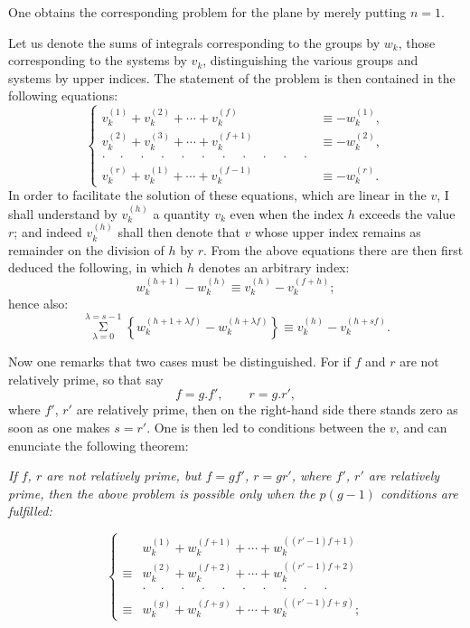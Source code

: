 \documentclass{article}
\begin{document}
One obtains the corresponding problem for the plane by merely putting $n=1$.

Let us denote the sums of integrals corresponding to the groups by $w_{k}$, those corresponding to the systems by $v_{k}$, distinguishing the various groups and systems by upper indices. The statement of the problem is then contained in the following equations:
\[ \left\{ \begin{aligned}
v_{k}^{(1)}+v_{k}^{(2)}+\cdots+v_{k}^{(f)} &\equiv -w_{k}^{(1)}, \\
v_{k}^{(2)}+v_{k}^{(3)}+\cdots+v_{k}^{(f+1)} &\equiv -w_{k}^{(2)}, \\
\cdot\quad\cdot\quad\cdot\quad\cdot\quad\cdot\quad\cdot\quad\cdot\quad\cdot\quad\cdot\quad\cdot\quad\cdot & \\
v_{k}^{(r)}+v_{k}^{(1)}+\cdots+v_{k}^{(f-1)} &\equiv -w_{k}^{(r)}.
\end{aligned} \right. \tag{1.} \]
In order to facilitate the solution of these equations, which are linear in the $v$, I shall understand by $v_{k}^{(h)}$ a quantity $v_{k}$ even when the index $h$ exceeds the value $r$; and indeed $v_{k}^{(h)}$ shall then denote that $v$ whose upper index remains as remainder on the division of $h$ by $r$. From the above equations there are then first deduced the following, in which $h$ denotes an arbitrary index:
\[ w_{k}^{(h+1)}-w_{k}^{(h)} \equiv v_{k}^{(h)}-v_{k}^{(f+h)}; \]
hence also:
\[ \mathop{\Sigma}\limits_{\lambda=0}^{\lambda=s-1} \left\{ w_{k}^{(h+1+\lambda f)}-w_{k}^{(h+\lambda f)} \right\} \equiv v_{k}^{(h)}-v_{k}^{(h+sf)}. \tag{2.} \]

Now one remarks that two cases must be distinguished. For if $f$ and $r$ are not relatively prime, so that say
\[ f=g.f', \qquad r=g.r', \]
where $f'$, $r'$ are relatively prime, then on the right-hand side there stands zero as soon as one makes $s=r'$. One is then led to conditions between the $v$, and can enunciate the following theorem:

\emph{If $f$, $r$ are not relatively prime, but $f=gf'$, $r=gr'$, where $f'$, $r'$ are relatively prime, then the above problem is possible only when the $p(g-1)$ conditions are fulfilled:}

\[ \left\{ \begin{aligned}
& w_{k}^{(1)}+w_{k}^{(f+1)}+\cdots+w_{k}^{((r'-1)f+1)} \\
\equiv{} & w_{k}^{(2)}+w_{k}^{(f+2)}+\cdots+w_{k}^{((r'-1)f+2)} \\
& \cdot\quad\cdot\quad\cdot\quad\cdot\quad\cdot\quad\cdot\quad\cdot\quad\cdot\quad\cdot\quad\cdot \\
\equiv{} & w_{k}^{(g)}+w_{k}^{(f+g)}+\cdots+w_{k}^{((r'-1)f+g)};
\end{aligned} \right. \tag{3.} \]
\end{document}
